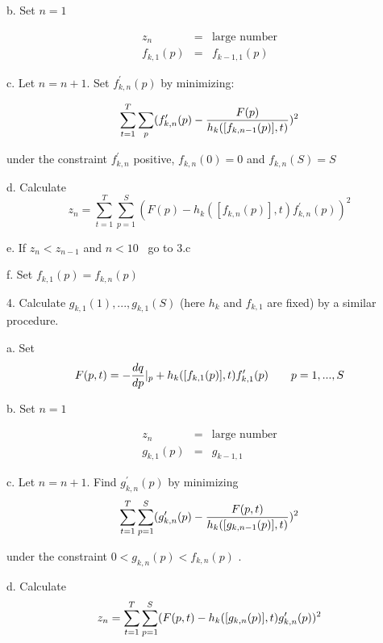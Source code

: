 \documentclass{article}
\begin{document}
\qquad b. Set $n=1$

\begin{eqnarray*}
z_{n} &=&\text{large number} \\
f_{k,1}(p) &=&f_{k-1,1}(p)
\end{eqnarray*}

\qquad c. Let $n=n+1$. Set $f_{k,n}^{\prime }(p)$ by minimizing:

\begin{equation*}
\sum_{t=1}^{T}\sum_{p}(f_{k,n}^{\prime }(p)-\frac{F(p)}{%
h_{k}([f_{k,n-1}(p)],t)})^{2}
\end{equation*}

\qquad under the constraint $f_{k,n}^{\prime }$ positive, $f_{k,n}(0)=0$ and 
$f_{k,n}(S)=S$

\qquad d. Calculate%
\begin{equation*}
z_{n}=\sum_{t=1}^{T}\sum_{p=1}^{S}(F(p)-h_{k}([f_{k,n}(p)],t)f_{k,n}^{\prime
}(p))^{2}
\end{equation*}

\qquad e. If $z_{n}<z_{n-1}$ and $n<10$ \ go to 3.c

\qquad f. Set $f_{k,1}(p)=f_{k,n}(p)$

4. Calculate $g_{k,1}(1),...,g_{k,1}(S)$ (here $h_{k}$ and $f_{k,1}$ are
fixed) by a similar procedure.

\qquad a. Set 
\begin{equation*}
F(p,t)=-\frac{dq}{dp}|_{p}+h_{k}([f_{k,1}(p)],t)f_{k,1}^{\prime }(p)\text{ \
\ \ }p=1,...,S
\end{equation*}

\qquad b. Set $n=1$

\begin{eqnarray*}
z_{n} &=&\text{large number} \\
g_{k,1}(p) &=&g_{k-1,1}
\end{eqnarray*}

\qquad c. Let $n=n+1$. Find $g_{k,n}^{\prime }(p)$ by minimizing%
\begin{equation*}
\sum_{t=1}^{T}\sum_{p=1}^{S}(g_{k,n}^{\prime }(p)-\frac{F(p,t)}{%
h_{k}([g_{k,n-1}(p)],t)})^{2}
\end{equation*}

\qquad under the constraint $0<g_{k,n}(p)<f_{k,n}(p)$ .

\qquad d. Calculate%
\begin{equation*}
z_{n}=\sum_{t=1}^{T}\sum_{p=1}^{S}(F(p,t)-h_{k}([g_{k,n}(p)],t)g_{k,n}^{%
\prime }(p))^{2}
\end{equation*}
\end{document}
